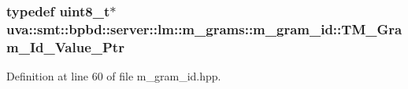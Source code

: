 \subsubsection[{T\+M\+\_\+\+Gram\+\_\+\+Id\+\_\+\+Value\+\_\+\+Ptr}]{\setlength{\rightskip}{0pt plus 5cm}typedef uint8\+\_\+t$\ast$ {\bf uva\+::smt\+::bpbd\+::server\+::lm\+::m\+\_\+grams\+::m\+\_\+gram\+\_\+id\+::\+T\+M\+\_\+\+Gram\+\_\+\+Id\+\_\+\+Value\+\_\+\+Ptr}}\label{namespaceuva_1_1smt_1_1bpbd_1_1server_1_1lm_1_1m__grams_1_1m__gram__id_aa605051ded9336178d905e9581702378}


Definition at line 60 of file m\+\_\+gram\+\_\+id.\+hpp.

